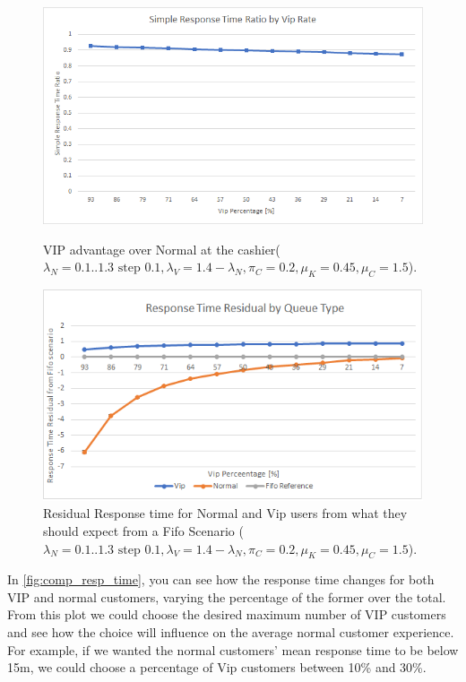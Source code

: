 \begin{figure}[h!]
  \centering
  \begin{minipage}{0.48\textwidth}
    \includegraphics[width=\textwidth]{figs/simpleResponseTimeRatio.png}
    \caption{VIP advantage over Normal at the cashier($\lambda_N={{0.1..1.3 \text{ step } 0.1}},\lambda_V=1.4-\lambda_N,\pi_C=0.2, \mu_K=0.45, \mu_C=1.5$).}
    \label{fig:simpleResponseTimeRatio}
  \end{minipage}\hspace{0.03\textwidth}
  \begin{minipage}{0.48\textwidth}
    \includegraphics[width=\textwidth]{figs/responseTimeResidualCashier.png}
    \caption{Residual Response time for Normal and Vip users from what they should expect from a Fifo Scenario ($\lambda_N={{0.1..1.3 \text{ step } 0.1}},\lambda_V=1.4-\lambda_N,\pi_C=0.2, \mu_K=0.45, \mu_C=1.5$).}
    \label{fig:residual-cashier}
  \end{minipage}
\end{figure}

In \cref{fig:comp_resp_time}, you can see how the response time changes for both VIP and normal customers, varying the percentage of the former over the total. 
From this plot we could choose the desired maximum number of VIP customers and see how the choice will influence on the average normal customer experience. For example, if we wanted the normal customers' mean response time to be below 15m, we could choose a percentage of Vip customers between 10\% and 30\%.

